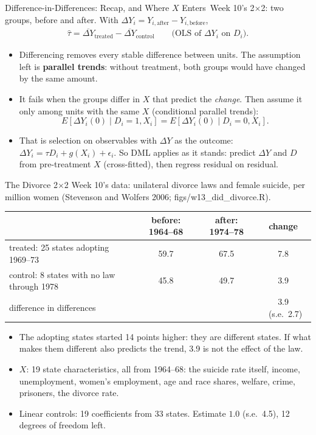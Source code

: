 \documentclass[aspectratio=169,11pt,xcolor=dvipsnames]{beamer}
\newcommand{\srcp}[1]{{\scriptsize\color{gray}(#1)}}
\newcommand{\E}{E}
\newcommand{\core}{\,\raisebox{0.6pt}{\textcolor{corestar}{$\bigstar$}}}
\begin{document}
\begin{frame}{Difference-in-Differences: Recap, and Where $X$ Enters\core}
Week 10's 2$\times$2: two groups, before and after. With $\Delta Y_i = Y_{i,\text{after}} - Y_{i,\text{before}}$,
\begin{align*}
  \hat\tau = \overline{\Delta Y}_{\text{treated}} - \overline{\Delta Y}_{\text{control}}
  \qquad \text{(OLS of $\Delta Y_i$ on $D_i$)} .
\end{align*}
\begin{itemize}\itemsep2pt
  \item Differencing removes every stable difference between units. The assumption left is
        \textbf{parallel trends}: without treatment, both groups would have changed by the same amount.
  \item It fails when the groups differ in $X$ that predict the \emph{change}. Then assume it only among
        units with the same $X$ (conditional parallel trends):
  \[
    \E[\Delta Y_i(0)\mid D_i = 1, X_i] = \E[\Delta Y_i(0)\mid D_i = 0, X_i] .
  \]
  \item That is selection on observables with $\Delta Y$ as the outcome: $\Delta Y_i = \tau D_i + g(X_i) + \epsilon_i$. So DML
        applies as it stands: predict $\Delta Y$ and $D$ from pre-treatment $X$ (cross-fitted), then regress
        residual on residual.
\end{itemize}
\end{frame}

\begin{frame}{The Divorce 2$\times$2}
Week 10's data: unilateral divorce laws and female suicide, per million women \srcp{Stevenson and
Wolfers 2006; figs/w13\_did\_divorce.R}.
\begin{center}\small
\renewcommand{\arraystretch}{1.12}
\begin{tabular}{@{}lccc@{}}
\toprule
& before: 1964--68 & after: 1974--78 & change \\
\midrule
treated: 25 states adopting 1969--73 & 59.7 & 67.5 & 7.8 \\
control: 8 states with no law through 1978 & 45.8 & 49.7 & 3.9 \\
\midrule
difference in differences & & & 3.9 \ (s.e.\ 2.7) \\
\bottomrule
\end{tabular}
\end{center}
\begin{itemize}\itemsep4pt
  \item The adopting states started 14 points higher: they are different states. If what makes them
        different also predicts the trend, 3.9 is not the effect of the law.
  \item $X$: 19 state characteristics, all from 1964--68: the suicide rate itself, income, unemployment,
        women's employment, age and race shares, welfare, crime, prisoners, the divorce rate.
  \item Linear controls: 19 coefficients from 33 states. Estimate $1.0$ (s.e.\ 4.5), 12 degrees of freedom left.
\end{itemize}
\end{frame}
\end{document}
